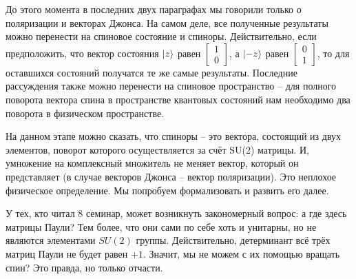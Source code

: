 До этого момента в последних двух параграфах мы говорили только о поляризации и векторах Джонса. На самом деле, все полученные результаты можно перенести на спиновое состояние и спиноры. Действительно, если предположить, что вектор состояния $\ket{z}$ равен $\begin{bmatrix} 1 \\ 0 \end{bmatrix}$, а $\ket{-z}$ равен $\begin{bmatrix} 0 \\ 1 \end{bmatrix}$, то для оставшихся состояний получатся те же самые результаты. Последние рассуждения также можно перенести на спиновое пространство -- для полного поворота вектора спина в пространстве квантовых состояний нам необходимо два поворота в физическом пространстве.

На данном этапе можно сказать, что спиноры -- это вектора, состоящий из двух элементов, поворот которого осуществляется за счёт SU(2) матрицы. И, умножение на комплексный множитель не меняет вектор, который он представляет (в случае векторов Джонса -- вектор поляризации). Это неплохое физическое определение. Мы попробуем формализовать и развить его далее.

У тех, кто читал 8 семинар, может возникнуть закономерный вопрос: а где здесь матрицы Паули? Тем более, что они сами по себе хоть и унитарны, но не являются элементами $SU(2)$ группы. Действительно, детерминант всё трёх матриц Паули не будет равен $+1$. Значит, мы не можем с их помощью вращать спин? Это правда, но только отчасти.
